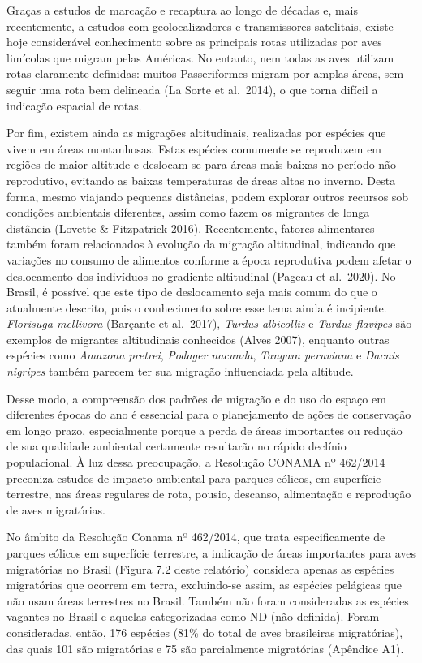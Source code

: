 \documentclass[
  oneside]{scrbook}
\begin{document}
Graças a estudos de marcação e recaptura ao longo de décadas e, mais recentemente, a estudos com geolocalizadores e transmissores satelitais, existe hoje considerável conhecimento sobre as principais rotas utilizadas por aves limícolas que migram pelas Américas. No entanto, nem todas as aves utilizam rotas claramente definidas: muitos Passeriformes migram por amplas áreas, sem seguir uma rota bem delineada (La Sorte et al.~2014), o que torna difícil a indicação espacial de rotas.

Por fim, existem ainda as migrações altitudinais, realizadas por espécies que vivem em áreas montanhosas. Estas espécies comumente se reproduzem em regiões de maior altitude e deslocam-se para áreas mais baixas no período não reprodutivo, evitando as baixas temperaturas de áreas altas no inverno. Desta forma, mesmo viajando pequenas distâncias, podem explorar outros recursos sob condições ambientais diferentes, assim como fazem os migrantes de longa distância (Lovette \& Fitzpatrick 2016). Recentemente, fatores alimentares também foram relacionados à evolução da migração altitudinal, indicando que variações no consumo de alimentos conforme a época reprodutiva podem afetar o deslocamento dos indivíduos no gradiente altitudinal (Pageau et al.~2020). No Brasil, é possível que este tipo de deslocamento seja mais comum do que o atualmente descrito, pois o conhecimento sobre esse tema ainda é incipiente. \emph{Florisuga mellivora} (Barçante et al.~2017), \emph{Turdus albicollis} e \emph{Turdus flavipes} são exemplos de migrantes altitudinais conhecidos (Alves 2007), enquanto outras espécies como \emph{Amazona pretrei}, \emph{Podager nacunda}, \emph{Tangara peruviana} e \emph{Dacnis nigripes} também parecem ter sua migração influenciada pela altitude.

Desse modo, a compreensão dos padrões de migração e do uso do espaço em diferentes épocas do ano é essencial para o planejamento de ações de conservação em longo prazo, especialmente porque a perda de áreas importantes ou redução de sua qualidade ambiental certamente resultarão no rápido declínio populacional. À luz dessa preocupação, a Resolução CONAMA nº 462/2014 preconiza estudos de impacto ambiental para parques eólicos, em superfície terrestre, nas áreas regulares de rota, pousio, descanso, alimentação e reprodução de aves migratórias.

No âmbito da Resolução Conama nº 462/2014, que trata especificamente de parques eólicos em superfície terrestre, a indicação de áreas importantes para aves migratórias no Brasil (Figura 7.2 deste relatório) considera apenas as espécies migratórias que ocorrem em terra, excluindo-se assim, as espécies pelágicas que não usam áreas terrestres no Brasil. Também não foram consideradas as espécies vagantes no Brasil e aquelas categorizadas como ND (não definida). Foram consideradas, então, 176 espécies (81\% do total de aves brasileiras migratórias), das quais 101 são migratórias e 75 são parcialmente migratórias (Apêndice A1).
\end{document}
